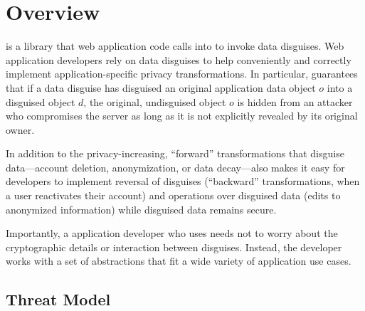 \section{\sys Overview}
\label{s:overview}

%
\sys is a library that web application code calls into to invoke data disguises.
%
Web application developers rely on data disguises to help conveniently and
correctly implement application-specific privacy transformations.
%
In particular, \sys guarantees that if a data disguise has disguised an original
application data object $o$ into a disguised object $d$, the original, undisguised
object $o$ is hidden from an attacker who compromises the server as long as it is
not explicitly revealed by its original owner.
%

%
In addition to the privacy-increasing, ``forward'' transformations that disguise
data---\eg account deletion, anonymization, or data decay---\sys also makes it easy for
developers to implement reversal of disguises (``backward'' transformations, \eg when a
user reactivates their account) and operations over disguised data (\eg edits to
anonymized information) while disguised data remains secure.
%

%
Importantly, a application developer who uses \sys needs not to worry about the
cryptographic details or interaction between disguises.
%
Instead, the developer works with a set of abstractions that fit a wide
variety of application use cases.
%

\subsection{Threat Model}
\label{s:threat}

